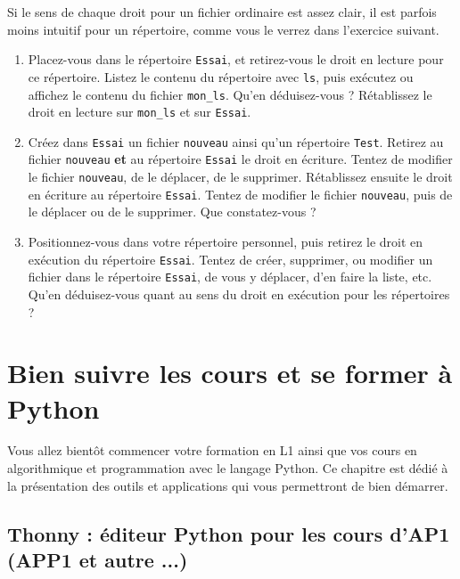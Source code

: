 \documentclass{article}
\begin{document}
Si le sens de chaque droit pour un fichier ordinaire est assez clair, il
est parfois moins intuitif pour un répertoire, comme vous le verrez dans
l'exercice suivant.

\begin{exercice}[Un test.]

\begin{enumerate}
\def\labelenumi{\arabic{enumi}.}
\item
  Placez-vous dans le répertoire \texttt{Essai}, et retirez-vous le
  droit en lecture pour ce répertoire. Listez le contenu du répertoire
  avec \texttt{ls}, puis exécutez ou affichez le contenu du fichier
  \texttt{mon\_ls}. Qu'en déduisez-vous ? Rétablissez le droit en
  lecture sur \texttt{mon\_ls} et sur \texttt{Essai}.
\item
  Créez dans \texttt{Essai} un fichier \texttt{nouveau} ainsi qu'un
  répertoire \texttt{Test}. Retirez au fichier \texttt{nouveau}
  \textbf{et} au répertoire \texttt{Essai} le droit en écriture. Tentez
  de modifier le fichier \texttt{nouveau}, de le déplacer, de le
  supprimer. Rétablissez ensuite le droit en écriture au répertoire
  \texttt{Essai}. Tentez de modifier le fichier \texttt{nouveau}, puis
  de le déplacer ou de le supprimer. Que constatez-vous ?
\item
  Positionnez-vous dans votre répertoire personnel, puis retirez le
  droit en exécution du répertoire \texttt{Essai}. Tentez de créer,
  supprimer, ou modifier un fichier dans le répertoire \texttt{Essai},
  de vous y déplacer, d'en faire la liste, etc. Qu'en déduisez-vous
  quant au sens du droit en exécution pour les répertoires ?
\end{enumerate}

\end{exercice}

\section {Bien suivre les cours et se former à Python}

Vous allez bientôt commencer votre formation en L1 ainsi que vos cours en algorithmique et programmation avec le langage Python. Ce chapitre est dédié à la présentation des outils et applications qui vous permettront de bien démarrer.

\subsection{Thonny : éditeur Python pour les cours d'AP1 (APP1 et autre ...)}
\end{document}
